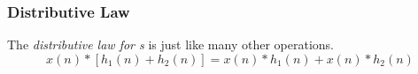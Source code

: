 \subsubsection{Distributive Law}\label{subsubsec:Convolution_Property-Distributive}
\begin{definition}\label{def:Convolution_Property-Distributive}
  The \emph{distributive law for s} is just like many other operations.
  \begin{equation}\label{eq:Convolution_Property-Distributive}
    x(n) * \left[ h_{1}(n) + h_{2}(n) \right] = x(n) * h_{1}(n) + x(n) * h_{2}(n)
  \end{equation}
\end{definition}

